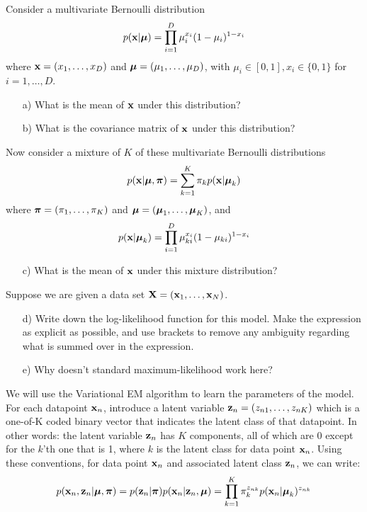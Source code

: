 \documentclass{amsmlaj}
\begin{document}
\begin{problem}
Consider a multivariate Bernoulli distribution
$$p(\bm{\mathbf{x}} | \bm{\mathbf{\mu}}) = \prod_{i=1}^D \mu_i^{x_i} (1-\mu_i)^{1-x_i}$$
where $\bm{\mathbf{x}} = (x_1,\dots,x_D)$ and $\bm{\mathbf{\mu}} = (\mu_1,\dots,\mu_D)$, with $\mu_i \in [0,1], x_i \in \{0,1\}$ for $i=1,\dots,D$. 
\begin{itemize}
  \item[a)] What is the mean of $\bm{\mathbf{x}}$ under this distribution?
  \item[b)] What is the covariance matrix of $\bm{\mathbf{x}}$ under this distribution?
 \end{itemize}
  Now consider a mixture of $K$ of these multivariate Bernoulli distributions
$$p(\bm{\mathbf{x}} | \bm{\mathbf{\mu}},\bm{\mathbf{\pi}}) = \sum_{k=1}^K \pi_k p(\bm{\mathbf{x}} | \bm{\mathbf{\mu}}_k)$$
where $\bm{\mathbf{\pi}} = (\pi_1, \dots, \pi_K)$ and $\bm{\mathbf{\mu}} = (\bm{\mathbf{\mu}}_1,\dots,\bm{\mathbf{\mu}}_K)$, and
$$p(\bm{\mathbf{x}} | \bm{\mathbf{\mu}}_k) = \prod_{i=1}^D \mu_{ki}^{x_i} (1-\mu_{ki})^{1-x_i}$$
\begin{itemize}
  \item[c)] What is the mean of $\bm{\mathbf{x}}$ under this mixture distribution? 
 \end{itemize}
 Suppose we are given a data set $\bm{\mathbf{X}} = (\bm{\mathbf{x}}_1,\dots,\bm{\mathbf{x}}_N)$.
 
\begin{itemize}
  \item[d)] Write down the log-likelihood function for this model. Make the expression as explicit as possible, and use brackets to remove any ambiguity regarding what is summed over in the expression.
  \item[e)] Why doesn't standard maximum-likelihood work here? 
\end{itemize}

We will use the Variational EM algorithm to learn the parameters of the model. For each datapoint $\bm{\mathbf{x}}_n$,
introduce a latent variable $\bm{\mathbf{z}}_n = (z_{n1},\dots,z_{nK})$ which is a one-of-K coded
binary vector that indicates the latent class of that datapoint. In other words: the latent variable 
$\bm{\mathbf{z}}_n$ has $K$ components, all of which are 0 except for the $k$'th one that is 1, where $k$ is
the latent class for data point $\bm{\mathbf{x}}_n$. 
Using these conventions, for data point $\bm{\mathbf{x}}_n$ and associated latent class $\bm{\mathbf{z}}_n$, we can write:
$$p(\bm{\mathbf{x}}_n, \bm{\mathbf{z}}_n | \bm{\mathbf{\mu}}, \bm{\mathbf{\pi}}) =  p(\bm{\mathbf{z}}_n | \bm{\mathbf{\pi}}) p(\bm{\mathbf{x}}_n | \bm{\mathbf{z}}_n, \bm{\mathbf{\mu}}) = \prod_{k=1}^K \pi_k^{z_{nk}} p(\bm{\mathbf{x}}_n | \bm{\mathbf{\mu}}_k)^{z_{nk}}$$ 


\end{problem}
\end{document}
